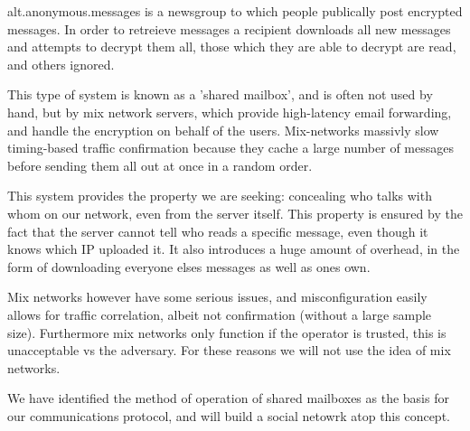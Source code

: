 alt.anonymous.messages is a newsgroup to which people publically post encrypted
messages. In order to retreieve messages a recipient downloads all new messages
and attempts to decrypt them all, those which they are able to decrypt are read,
and others ignored.

This type of system is known as a 'shared mailbox', and is often not used by
hand, but by mix network servers, which provide high-latency email forwarding,
and handle the encryption on behalf of the users. Mix-networks massivly slow
timing-based traffic confirmation because they cache a large number of messages
before sending them all out at once in a random order.

This system provides the property we are seeking: concealing who talks with whom
on our network, even from the server itself. This property is ensured by the
fact that the server cannot tell who reads a specific message, even though it
knows which IP uploaded it. It also introduces a huge amount of overhead, in the
form of downloading everyone elses messages as well as ones own.

Mix networks however have some serious issues, and misconfiguration easily
allows for traffic correlation\cite{mixnet}, albeit not confirmation (without a
large sample size). Furthermore mix networks only function if the operator is
trusted, this is unacceptable vs the adversary. For these reasons we will not
use the idea of mix networks.

We have identified the method of operation of shared mailboxes as the basis for
our communications protocol, and will build a social netowrk atop this concept.
